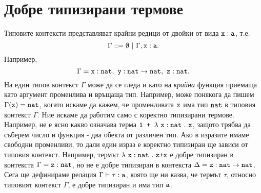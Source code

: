 \section{Добре типизирани термове}

Типовите контексти представляват крайни редици от двойки от вида $\texttt{x}:\texttt{a}$, т.е.
\[\Gamma ::= \emptyset\ |\ \Gamma,\type{x}{a}.\]
Например,
\[\Gamma = \texttt{x}:\texttt{nat},\ \texttt{y}:\texttt{nat} \to \texttt{nat},\ \texttt{z}:\texttt{nat}.\]
На един типов контекст $\Gamma$ може да се гледа и като на \emph{крайна} функция приемаща като аргумент променлива и връщаща тип.
Например, може понякога да пишем $\Gamma(\texttt{x}) = \texttt{nat}$, когато искаме да кажем, че променливата $\texttt{x}$ има тип $\texttt{nat}$ в типовия контекст $\Gamma$.
Ние искаме да работим само с коректно типизирани термове.
Например, не е ясно какво означава терма $\texttt{1 + }\lambda~\texttt{x}:\texttt{nat}~.~{\texttt{x}}$,
защото трябва да съберем число и функция - два обекта от различен тип.
Ако в изразите имаме свободни променливи, то дали един израз е коректно типизиран ще зависи от типовия контекст.
Например, термът $\lambda~\texttt{x}:\texttt{nat}~.~{\texttt{z+x}}$ е добре типизиран в контекста $\Gamma = \texttt{z}:\texttt{nat}$, но не е добре типизиран в контекста
$\Delta = \texttt{z}:\texttt{nat}\to\texttt{nat}$.
Сега ще дефинираме релация $\Gamma \vdash \tau : \texttt{a}$, която ще ни казва, че термът $\tau$, относно типовият контекст $\Gamma$,
е добре типизиран и има тип $\texttt{a}$.


